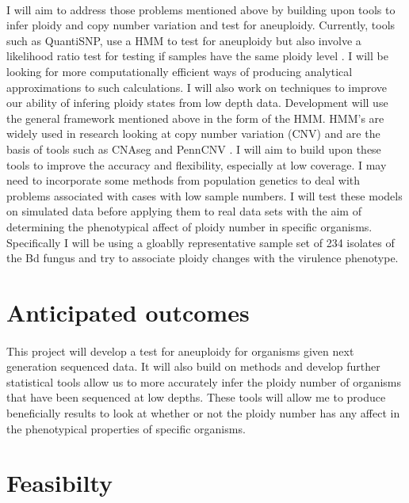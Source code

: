 \documentclass[11pt]{article}
\begin{document}
\paragraph{} I will aim to address those problems mentioned above by building upon tools to infer ploidy and copy number variation and test for aneuploidy. Currently, tools such as QuantiSNP, use a HMM to test for aneuploidy but also involve a likelihood ratio test for testing if samples have the same ploidy level \autocite{Colella2007}. I will be looking for more computationally efficient ways of producing analytical approximations to such calculations. I will also work on techniques to improve our ability of infering ploidy states from low depth data. Development will use the general framework mentioned above in the form of the HMM. HMM's are widely used in research looking at copy number variation (CNV) and are the basis of tools such as CNAseg and PennCNV \autocite{Min2013, Kai2007}. I will aim to build upon these tools to improve the accuracy and flexibility, especially at low coverage. I may need to incorporate some methods from population genetics to deal with problems associated with cases with low sample numbers. I will test these models on simulated data before applying them to real data sets with the aim of determining the phenotypical affect of ploidy number in specific organisms. Specifically I will be using a gloablly representative sample set of 234 isolates of the Bd fungus \autocite{Ferrer2011} and try to associate ploidy changes with the virulence phenotype.
\section{Anticipated outcomes}
\paragraph{} This project will develop a test for aneuploidy for organisms given next generation sequenced data. It will also build on methods and develop further statistical tools allow us to more accurately infer the ploidy number of organisms that have been sequenced at low depths. These tools will allow me to produce beneficially results to look at whether or not the ploidy number has any affect in the phenotypical properties of specific organisms. 
\section{Feasibilty}
\end{document}

